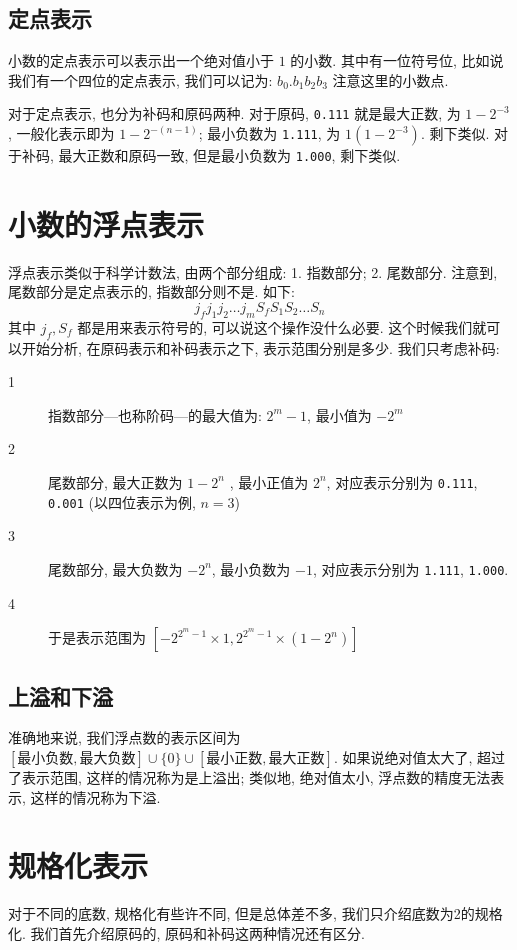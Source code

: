 \documentclass[12pt]{ctexart}
\theoremstyle{definition}
\theoremstyle{plain}
\begin{document}
\subsection{定点表示}
小数的定点表示可以表示出一个绝对值小于 \(1\) 的小数. 其中有一位符号位, %
比如说我们有一个四位的定点表示, 我们可以记为: \(b_{0}.b_{1}b_{2}b_{3}\) 注意这里的小数点. 

对于定点表示, 也分为补码和原码两种. 对于原码, \texttt{0.111} 就是最大正数, 为 \(1 - 2^{-3}\), 一般化表示即为 \(1- 2^{-(n-1)}\); 最小负数为 \texttt{1.111}, 为 \(1 (1- 2 ^{ -3})\). 剩下类似. 对于补码, 最大正数和原码一致, 但是最小负数为 \texttt{1.000}, 剩下类似. 

\section{小数的浮点表示}
浮点表示类似于科学计数法, 由两个部分组成: 1. 指数部分; 2. 尾数部分. 注意到, 尾数部分是定点表示的, 指数部分则不是. 如下:
\begin{equation}
j_{f}j_{1}j_{2}\dots j_{m}S_{f}S_{1}S_{2}\dots S_{n}
\end{equation}
其中 \(j_{f}, S_{f}\) 都是用来表示符号的, 可以说这个操作没什么必要. 这个时候我们就可以开始分析, 在原码表示和补码表示之下, 表示范围分别是多少. 我们只考虑补码:

\begin{description}
\item [1] 指数部分---也称阶码---的最大值为: \(2^{m} -1 \), 最小值为 \(- 2 ^{m}\) 
\item [2] 尾数部分, 最大正数为 \(1-2^{n}\) , 最小正值为 \(2^{n}\), 对应表示分别为 \texttt{0.111}, \texttt{0.001} (以四位表示为例, \(n=3\))
\item [3] 尾数部分, 最大负数为 \(-2 ^{n}\), 最小负数为 \(-1\), 对应表示分别为 \texttt{1.111}, \texttt{1.000}.
\item [4] 于是表示范围为 \( [- 2 ^{2^{m}- 1} \times 1 , 2 ^{2^{m} -1} \times (1 - 2 ^{n} )]\)
\end{description}
\subsection{上溢和下溢}
准确地来说, 我们浮点数的表示区间为 \([\text{最小负数}, \text{最大负数}] \cup \{0\} \cup [\text{最小正数}, \text{最大正数} ]\). 如果说绝对值太大了, 超过了表示范围, 这样的情况称为是上溢出; 类似地, 绝对值太小, 浮点数的精度无法表示, 这样的情况称为下溢. 


\section{规格化表示}
对于不同的底数, 规格化有些许不同, 但是总体差不多, 我们只介绍底数为2的规格化. %
我们首先介绍原码的, 原码和补码这两种情况还有区分. 
\end{document}
